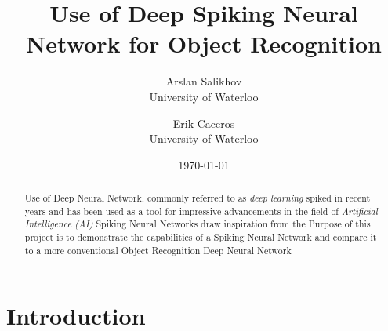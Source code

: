 \documentclass{article}
\title{Use of Deep Spiking Neural Network for Object Recognition}
\author{Arslan Salikhov  \\
	University of Waterloo  \\
	\and 
	Erik Caceros \\
	University of Waterloo \\
	}
\date{\today}
\begin{document}
\begin{titlingpage}
\maketitle
\end{titlingpage}


\begin{abstract}
Use of Deep Neural Network, commonly referred to as
\textit{deep learning} spiked in recent years and has been used
as a tool for impressive advancements in the field of 
\textit{Artificial Intelligence (AI)}
Spiking Neural Networks draw inspiration from the 
Purpose of this project is to demonstrate the capabilities of a 
Spiking Neural Network and compare it to a more conventional 
Object Recognition Deep Neural Network
\end{abstract}

\section{Introduction}
\end{document}
